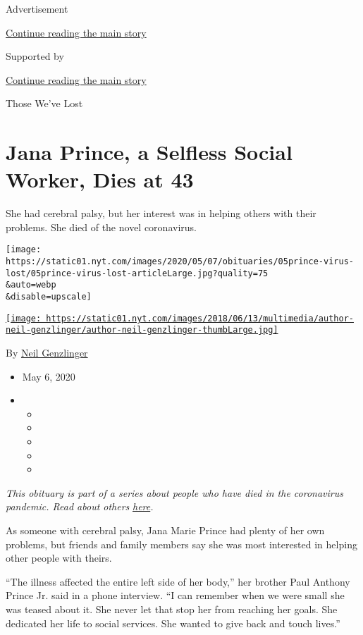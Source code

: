 Advertisement

\protect\hyperlink{after-top}{Continue reading the main story}

Supported by

\protect\hyperlink{after-sponsor}{Continue reading the main story}

Those We've Lost

\hypertarget{jana-prince-a-selfless-social-worker-dies-at-43}{%
\section{Jana Prince, a Selfless Social Worker, Dies at
43}\label{jana-prince-a-selfless-social-worker-dies-at-43}}

She had cerebral palsy, but her interest was in helping others with
their problems. She died of the novel coronavirus.

\texttt{[image: https://static01.nyt.com/images/2020/05/07/obituaries/05prince-virus-lost/05prince-virus-lost-articleLarge.jpg?quality=75\\\&auto=webp\\\&disable=upscale]}

\href{https://www.nytimes.com/by/neil-genzlinger}{\texttt{[image: https://static01.nyt.com/images/2018/06/13/multimedia/author-neil-genzlinger/author-neil-genzlinger-thumbLarge.jpg]}}

By \href{https://www.nytimes.com/by/neil-genzlinger}{Neil Genzlinger}

\begin{itemize}
\item
  May 6, 2020
\item
  \begin{itemize}
  \item
  \item
  \item
  \item
  \item
  \end{itemize}
\end{itemize}

\emph{This obituary is part of a series about people who have died in
the coronavirus pandemic. Read about others}
\href{https://www.nytimes.com/series/people-who-have-died-of-the-coronavirus}{\emph{here}}\emph{.}

As someone with cerebral palsy, Jana Marie Prince had plenty of her own
problems, but friends and family members say she was most interested in
helping other people with theirs.

``The illness affected the entire left side of her body,'' her brother
Paul Anthony Prince Jr. said in a phone interview. ``I can remember when
we were small she was teased about it. She never let that stop her from
reaching her goals. She dedicated her life to social services. She
wanted to give back and touch lives.''

